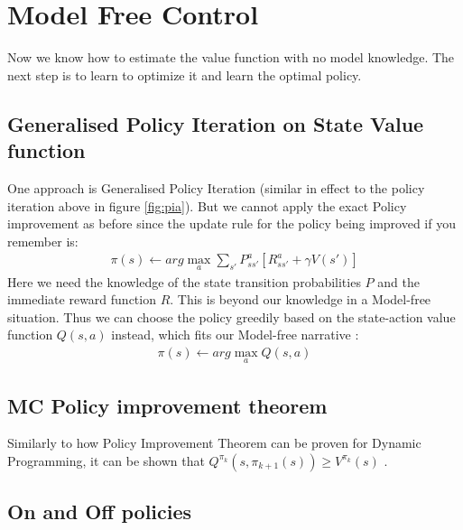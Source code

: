 \section{Model Free Control }
Now we know how to estimate the value function with no model knowledge. The next step is to learn to optimize it and learn the optimal policy. 


\subsection{Generalised Policy Iteration on State Value function} 
One approach is Generalised Policy Iteration (similar in effect to the policy iteration above in figure \ref{fig:pia}). But we cannot apply the exact Policy improvement as before since the update rule for the policy being improved if you remember is: 
\begin{align}
    \pi(s) \leftarrow arg \max_{a} \sum_{s'} P^{a}_{ss'} [R^{a}_{ss'} + \gamma V(s')]
\end{align}
Here we need the knowledge of the state transition probabilities $P$ and the immediate reward function $R$. This is beyond our knowledge in a Model-free situation. Thus we can choose the policy greedily based on the state-action value function $Q(s, a)$ instead, which fits our Model-free narrative \cite{lecture_mfc}:  
\begin{align}
    \pi(s) \leftarrow arg \max_{a} Q(s, a) 
\end{align}
\subsection{MC Policy improvement theorem}

Similarly to how Policy Improvement Theorem can be proven for Dynamic Programming, it can be shown that $Q^{\pi_k}(s, \pi_{k+1}(s)) \geq V^{\pi_k}(s)$ \cite{lecture_mfc}. 

\subsection{On and Off policies}

